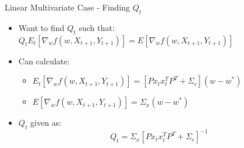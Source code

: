 \documentclass{beamer}
\begin{document}
\begin{frame}{Linear Multivariate Case - Finding $Q_t$}
    \begin{itemize}
        \item Want to find $Q_t$ such that: $Q_tE_t[\nabla_w f(w,X_{t+1},Y_{t+1})]=E[\nabla_w f(w,X_{t+1},Y_{t+1})]$
        \newline
        \item Can calculate:
        \begin{itemize}
            \item $E_t[\nabla_w f(w,X_{t+1},Y_{t+1})]=[Px_tx_t^TP^T+\Sigma_\epsilon](w-w^*)$
            \item $E[\nabla_w f(w,X_{t+1},Y_{t+1})]=\Sigma_x(w-w^*)$
            \newline
        \end{itemize}
        \item $Q_t$ given as:\\
        \begin{equation*}
            Q_t = \Sigma_x[Px_tx_t^TP^T+\Sigma_\epsilon]^{-1}
        \end{equation*}
    \end{itemize}
\end{frame}
\end{document}
